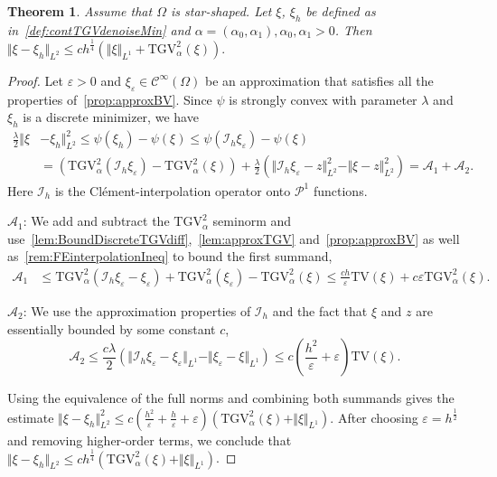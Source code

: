 \documentclass{article}
\newcommand{\TGV}{\mathrm{TGV}}
\newtheorem{theorem}{Theorem}[section]
\begin{document}
	\begin{theorem}
		\label{thm:semi_discrete_conv}
		Assume that $\Omega$ is star-shaped. Let $\xi$, $\xi_h$ be defined as in~\cref{def:contTGVdenoiseMin} and $\alpha = (\alpha_0, \alpha_1), \alpha_0, \alpha_1>0$. Then
		$
		\Vert \xi - \xi_h\Vert_{L^2} \leq ch^{\frac{1}{4}} \left( \Vert\xi\Vert_{L^1} +  \TGV_{\alpha}^2(\xi)\right).
		$
	\end{theorem}
	\begin{proof}
		Let $\varepsilon > 0 $ and $\xi_\varepsilon \in \mathcal{C}^\infty(\Omega)$ be an approximation that satisfies all the properties of~\cref{prop:approxBV}. Since $\psi$ is strongly convex with parameter ${\lambda}$ and $\xi_h$ is a discrete minimizer, we have
		\begin{align*}
			\frac{\lambda}{2}\Vert \xi& - \xi_h\Vert_{L^2}^2 \leq \psi(\xi_h) - \psi(\xi) \leq \psi(\mathcal{I}_h\xi_\varepsilon) - \psi(\xi)\\
			&= ( \TGV_{\alpha}^2(\mathcal{I}_h\xi_\varepsilon) - \TGV_{\alpha}^2(\xi)) +  \frac{\lambda}{2}(\Vert \mathcal{I}_h\xi_\varepsilon - z\Vert_{L^2}^2 -  \Vert \xi - z\Vert_{L^2}^2) = \mathcal{A}_1 + \mathcal{A}_2.
		\end{align*}
		Here $\mathcal{I}_h$ is the Clément-interpolation operator onto $\mathcal{P}^1$ functions.
		
		$\mathcal{A}_1$: We add and subtract the $\TGV_{\alpha}^2$ seminorm  and use~\cref{lem:BoundDiscreteTGVdiff},~\cref{lem:approxTGV} and~\cref{prop:approxBV} as well as~\cref{rem:FEinterpolationIneq}  to bound the first summand, 
		\begin{align*}
			\mathcal{A}_1 &\leq \TGV_{\alpha}^2(\mathcal{I}_h\xi_\varepsilon - \xi_\varepsilon) + \TGV_{\alpha}^2(\xi_\varepsilon) - \TGV_{\alpha}^2(\xi)\leq \frac{ch}{\varepsilon} \mathrm{TV}(\xi) + c\varepsilon \TGV_{\alpha}^2(\xi).
		\end{align*}
		
		$\mathcal{A}_2$: We use the approximation properties of $\mathcal{I}_h$ and the fact that $\xi$ and $z$ are essentially bounded by some constant $c$,
		\begin{equation*}
			\mathcal{A}_2 \leq \frac{c\lambda}{2}\left( \Vert \mathcal{I}_h\xi_\varepsilon - \xi_\varepsilon\Vert_{L^1} - \Vert \xi_\varepsilon - \xi\Vert_{L^1}\right) \leq c\left( \frac{h^2}{\varepsilon} + \varepsilon\right)  \mathrm{TV}(\xi).
		\end{equation*}

		Using the equivalence of the full norms and combining both summands gives the estimate $\Vert \xi - \xi_h\Vert_{L^2}^2 \leq c\left( \frac{h^2}{\varepsilon}  + \frac{h}{\varepsilon}+ \varepsilon\right)  (\TGV_{\alpha}^2(\xi) + \Vert \xi\Vert_{L^1})$.
		After choosing $\varepsilon = h^\frac{1}{2}$ and removing higher-order terms, we conclude that $\Vert \xi - \xi_h\Vert_{L^2} \leq ch^\frac{1}{4}  (\TGV_{\alpha}^2(\xi) + \Vert \xi\Vert_{L^1})$.
	\end{proof}
\end{document}
